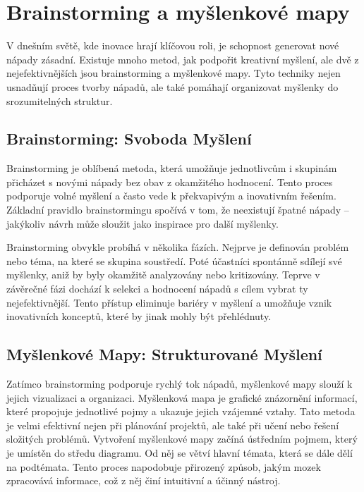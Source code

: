 \section{Brainstorming a myšlenkové mapy}

V dnešním světě, kde inovace hrají klíčovou roli, je schopnost generovat nové nápady zásadní. Existuje mnoho metod, jak podpořit kreativní myšlení, ale dvě z nejefektivnějších jsou brainstorming a myšlenkové mapy. Tyto techniky nejen usnadňují proces tvorby nápadů, ale také pomáhají organizovat myšlenky do srozumitelných struktur.\cite{brainstorming3}

\subsection{Brainstorming: Svoboda Myšlení}
Brainstorming je oblíbená metoda, která umožňuje jednotlivcům i skupinám přicházet s novými nápady bez obav z okamžitého hodnocení. Tento proces podporuje volné myšlení a často vede k překvapivým a inovativním řešením. Základní pravidlo brainstormingu spočívá v tom, že neexistují špatné nápady – jakýkoliv návrh může sloužit jako inspirace pro další myšlenky.\cite{brainstorming1}
\newline

Brainstorming obvykle probíhá v několika fázích. Nejprve je definován problém nebo téma, na které se skupina soustředí. Poté účastníci spontánně sdílejí své myšlenky, aniž by byly okamžitě analyzovány nebo kritizovány. Teprve v závěrečné fázi dochází k selekci a hodnocení nápadů s cílem vybrat ty nejefektivnější. Tento přístup eliminuje bariéry v myšlení a umožňuje vznik inovativních konceptů, které by jinak mohly být přehlédnuty.\cite{brainstorming2}

\subsection{Myšlenkové Mapy: Strukturované Myšlení}
Zatímco brainstorming podporuje rychlý tok nápadů, myšlenkové mapy slouží k jejich vizualizaci a organizaci. Myšlenková mapa je grafické znázornění informací, které propojuje jednotlivé pojmy a ukazuje jejich vzájemné vztahy. Tato metoda je velmi efektivní nejen při plánování projektů, ale také při učení nebo řešení složitých problémů.
\newpage
Vytvoření myšlenkové mapy začíná ústředním pojmem, který je umístěn do středu diagramu. Od něj se větví hlavní témata, která se dále dělí na podtémata. Tento proces napodobuje přirozený způsob, jakým mozek zpracovává informace, což z něj činí intuitivní a účinný nástroj.

